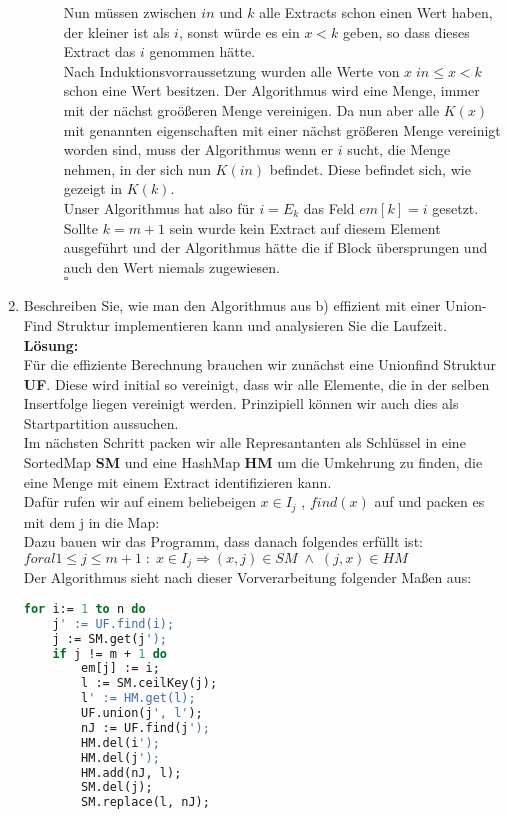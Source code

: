 \documentclass[11pt,a4paper,ngerman]{article}
\begin{document}
\begin{enumerate}[\bfseries a)]
\begin{description}
Nun müssen zwischen $in$ und $k$ alle Extracts schon einen Wert haben, der kleiner ist als $i$, sonst würde es ein $x<k$ geben, so dass dieses Extract das $i$ genommen hätte.\\

Nach Induktionsvorraussetzung wurden alle Werte von $x \; in \leq x < k$ schon eine Wert besitzen. Der Algorithmus wird eine Menge, immer mit der nächst groößeren Menge vereinigen. Da nun aber alle $K(x)$ mit genannten eigenschaften mit einer nächst größeren Menge vereinigt worden sind, muss der Algorithmus wenn er $i$ sucht, die Menge nehmen, in der sich nun $K(in)$ befindet. Diese befindet sich, wie gezeigt in $K(k)$.\\

Unser Algorithmus hat also für $i = E_k$ das Feld $em[k] = i$ gesetzt. Sollte $k=m+1$ sein wurde kein Extract auf diesem Element ausgeführt und der Algorithmus hätte die if Block übersprungen und auch den Wert niemals zugewiesen.\\
\mbox{}\hfill $\square$

\end{description}

\item Beschreiben Sie, wie man den Algorithmus aus b) effizient mit einer Union-Find Struktur implementieren kann und analysieren Sie die Laufzeit.\\

\textbf{Lösung:}\\
Für die effiziente Berechnung brauchen wir zunächst eine Unionfind Struktur \textbf{UF}. Diese wird initial so vereinigt, dass wir alle Elemente, die in der selben Insertfolge liegen vereinigt werden. Prinzipiell können wir auch dies als Startpartition aussuchen.\\

Im nächsten Schritt packen wir alle Represantanten als Schlüssel in eine SortedMap \textbf{SM} und eine HashMap \textbf{HM} um die Umkehrung zu finden, die eine Menge mit einem Extract identifizieren kann.\\
Dafür rufen wir auf einem beliebeigen $x \in I_j$ , $find(x)$ auf und packen es mit dem j in die Map:\\
Dazu bauen wir das Programm, dass danach folgendes erfüllt ist:\\
$foral 1 \leq j \leq m+1 \; : \; x \in I_j \Rightarrow (x,j)\in SM \; \land \; (j,x) \in HM$\\

Der Algorithmus sieht nach dieser Vorverarbeitung folgender Maßen aus:\\
\begin{lstlisting}[language=Pascal]
for i:= 1 to n do
	j' := UF.find(i);
	j := SM.get(j');
	if j != m + 1 do
		em[j] := i;
		l := SM.ceilKey(j);
		l' := HM.get(l);
		UF.union(j', l');
		nJ := UF.find(j');
		HM.del(i');
		HM.del(j');
		HM.add(nJ, l);
		SM.del(j);
		SM.replace(l, nJ);
\end{lstlisting}


\end{enumerate}
\end{document}
